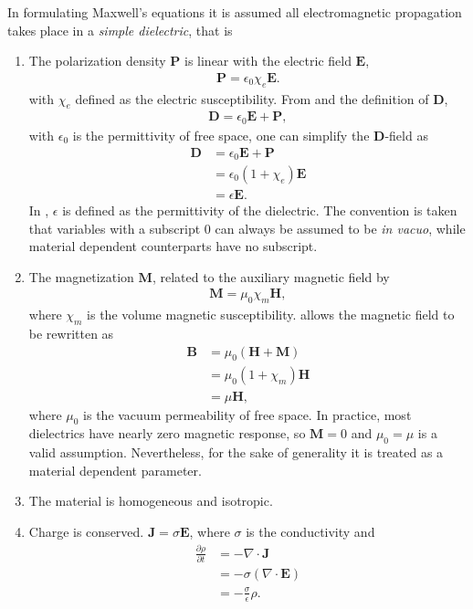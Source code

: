 In formulating Maxwell's equations it is assumed all electromagnetic
propagation takes place in a {\it simple dielectric}, that is
\begin{enumerate}
\item The polarization density $\mathbf{P}$ is linear with the electric
field $\mathbf{E}$,
\begin{align}
\mathbf{P}=\epsilon_0\chi_e\mathbf{E}.
\label{eqn:pdensity}
\end{align}
with $\chi_e$ defined as the electric susceptibility.  From
 and the definition
of $\mathbf{D}$,
\begin{align}
\mathbf{D}=\epsilon_0\mathbf{E}+\mathbf{P},
\label{eqn:dfield}
\end{align}
with $\epsilon_0$ is the permittivity of free space, one can simplify the
$\mathbf{D}$-field as 
\begin{align}
\mathbf{D}&=\epsilon_0\mathbf{E}+\mathbf{P}\\
&=\epsilon_0(1+\chi_e)\mathbf{E}\\
&=\epsilon\mathbf{E}.
\label{eqn:permittivitydangle}
\end{align}
In , $\epsilon$ is defined as the
permittivity of the dielectric.  The convention is taken 
that variables with a subscript $0$ can always be assumed to be 
{\it in vacuo}, while material dependent counterparts have
no subscript.  
\item The magnetization $\mathbf{M}$, related to the
auxiliary magnetic field by 
\begin{align}
\mathbf{M}=\mu_0\chi_m\mathbf{H},
\label{eqn:auxfield}
\end{align}
where $\chi_m$ is the volume magnetic susceptibility.
 allows the
magnetic field to be rewritten as
\begin{align}
\mathbf{B}&=\mu_0\left(\mathbf{H}+\mathbf{M}\right)\\
&=\mu_0\left(1+\chi_m\right)\mathbf{H}\\
&=\mu \mathbf{H},
\end{align}
where $\mu_0$ is the vacuum permeability of free space.  In practice, most
dielectrics have nearly zero magnetic response, so $\mathbf{M}=0$ and
$\mu_0=\mu$ is a valid assumption.  Nevertheless, for the sake of generality it is treated as a
material dependent parameter.
\item The material is homogeneous and isotropic.
\item Charge is conserved.  $\mathbf{J} = \sigma \mathbf{E}$, where
 $\sigma$ is the conductivity and
\begin{align}
 \frac{\partial \rho}{\partial t} 
  &= -\nabla \cdot \mathbf{J}\\
  &= -\sigma \left(\nabla \cdot \mathbf{E} \right) \\
  &= -\frac{\sigma}{\epsilon} \rho.
\end{align}
\end{enumerate}
